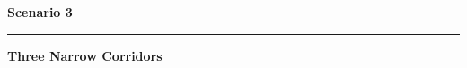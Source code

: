 \documentclass{article}
\begin{document}
\centering
\vspace*{\fill}
{\fontsize{44}{52}\selectfont\bfseries Scenario 3\par}
\vspace{8mm}
{\color{accent}\rule{32mm}{0.8mm}\par}
\vspace{10mm}
{\fontsize{40}{48}\selectfont\bfseries Three Narrow Corridors\par}
\vspace*{\fill}
\end{document}
